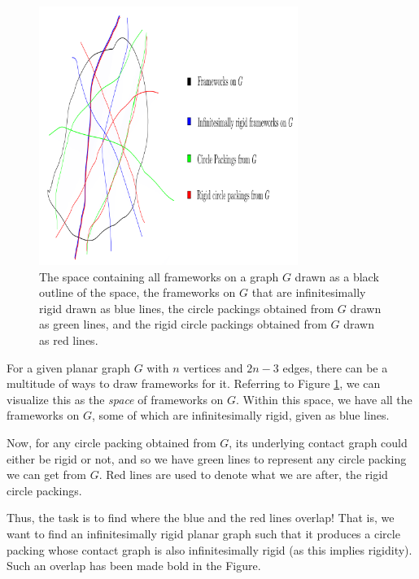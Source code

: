 \begin{figure}[htbp]
    \centering
    \includegraphics[width = 0.75\textwidth]{Chapter 4/5. configuration space.png}
    \caption{The space containing all frameworks on a graph $G$ drawn as a black outline of the space, the frameworks on $G$ that are infinitesimally rigid drawn as blue lines, the circle packings obtained from $G$ drawn as green lines, and the rigid circle packings obtained from $G$ drawn as red lines.}
    \label{fig4: config space}
\end{figure}

\begin{flushleft}
For a given planar graph $G$ with $n$ vertices and $2n - 3$ edges, there can be a multitude of ways to draw frameworks for it. Referring to Figure \ref{fig4: config space}, we can visualize this as the \textit{space} of frameworks on $G$. Within this space, we have all the frameworks on $G$, some of which are infinitesimally rigid, given as blue lines.  
\end{flushleft}

\begin{flushleft}
Now, for any circle packing obtained from $G$, its underlying contact graph could either be rigid or not, and so we have green lines to represent any circle packing we can get from $G$. Red lines are used to denote what we are after, the rigid circle packings. 
\end{flushleft}

\begin{flushleft}
Thus, the task is to find where the blue and the red lines overlap! That is, we want to find an infinitesimally rigid planar graph such that it produces a circle packing whose contact graph is also infinitesimally rigid (as this implies rigidity). Such an overlap has been made bold in the Figure. 
\end{flushleft}


